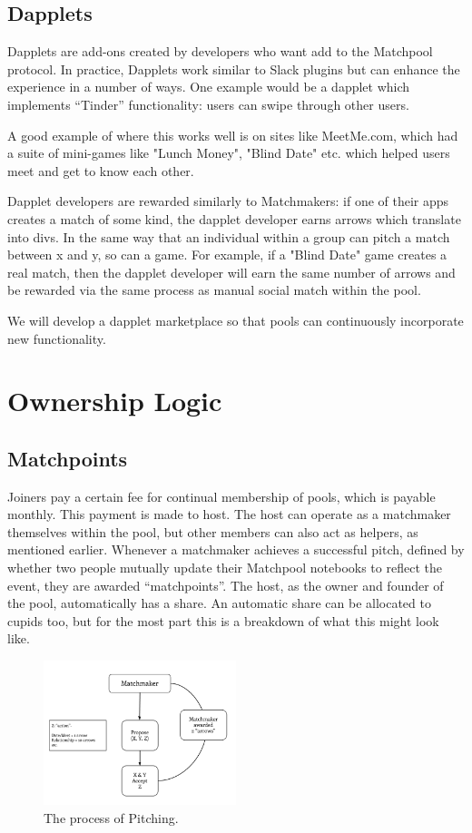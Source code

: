\documentclass[a4paper]{article}
\begin{document}
\subsection{Dapplets}
Dapplets are add-ons created by developers who want add to the Matchpool protocol. In practice, Dapplets work similar to Slack plugins but can enhance the experience in a number of ways. One example would be a dapplet which implements “Tinder” functionality: users can swipe through other users.

A good example of where this works well is on sites like MeetMe.com, which had a suite of mini-games like "Lunch Money", "Blind Date" etc. which helped users meet and get to know each other.

Dapplet developers are rewarded similarly to Matchmakers: if one of their apps creates a match of some kind, the dapplet developer earns arrows which translate into divs. In the same way that an individual within a group can pitch a match between x and y, so can a game. For example, if a "Blind Date" game creates a real match, then the dapplet developer will earn the same number of arrows and be rewarded via the same process as manual social match within the pool.

We will develop a dapplet marketplace so that pools can continuously incorporate new functionality.

\section{Ownership Logic}

\subsection{Matchpoints}
Joiners pay a certain fee for continual membership of pools, which is payable monthly. This payment is made to host. The host can operate as a matchmaker themselves within the pool, but other members can also act as helpers, as mentioned earlier. Whenever a matchmaker achieves a successful pitch, defined by whether two people mutually update their Matchpool notebooks to reflect the event, they are awarded “matchpoints”. The host, as the owner and founder of the pool, automatically has a share. An automatic share can be allocated to cupids too, but for the most part this is a breakdown of what this might look like.

\begin{figure}[!ht]
\centering
\includegraphics[width=0.5\textwidth]{arrowjourney.png}
\caption{\label{fig:Matchmakers} The process of Pitching.}
\end{figure}
\end{document}
